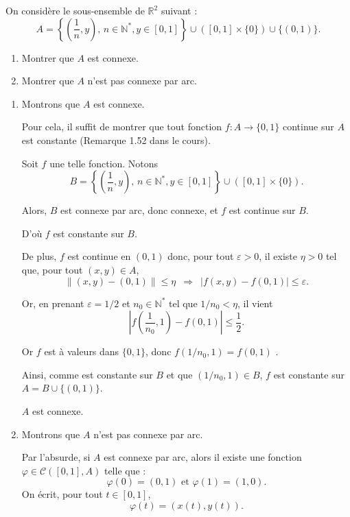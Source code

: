 \begin{question}{}{}
On considère le sous-ensemble de $\mathbb{R}^2$ suivant :
$$A = \left\{\left(\frac{1}{n},y\right),\, n\in\mathbb{N}^*,y\in[0,1]\right\} \cup \left([0,1]\times\{0\} \right)\cup\{(0,1)\}.$$

\begin{enumerate}

    \item Montrer que $A$ est connexe.
    \item Montrer que $A$ n'est pas connexe par arc.

\end{enumerate}

\end{question}

\begin{myproof}{}{}
\begin{enumerate}

    \item Montrons que $A$ est connexe.

Pour cela, il suffit de montrer que tout fonction $f:A\to \{0,1\}$ continue sur $A$ est constante (Remarque 1.52 dans le cours).

Soit $f$ une telle fonction. Notons
$$B=  \left\{\left(\frac{1}{n},y\right),\, n\in\mathbb{N}^*,y\in[0,1]\right\} \cup \left([0,1]\times\{0\} \right).$$

Alors, $B$ est connexe par arc, donc connexe, et $f$ est continue sur $B$.

D'où $f$ est constante sur $B$.

De plus, $f$ est continue en $(0,1)$ donc, pour tout $\varepsilon>0$, il existe $\eta > 0$ tel que, pour tout $(x,y) \in A$,
$$\|(x,y)-(0,1)\|\leq \eta \,\,\, \Longrightarrow \,\,\, |f(x,y) - f(0,1)| \leq \varepsilon.$$

Or, en prenant $\varepsilon=1/2$ et $n_0\in\mathbb{N}^*$ tel que $1/n_0<\eta$, il vient 
$$\left|f\left(\frac{1}{n_0},1\right) - f(0,1)\right|  \leq \frac{1}{2}.$$

Or $f$ est à valeurs dans $\{0,1\}$, donc $f(1/n_0,1) = f(0,1)$ .

Ainsi, comme est constante sur $B$ et que $(1/n_0,1)\in B$, $f$ est constante sur $A=B\cup\{(0,1)\}$.

$A$ est connexe.

\item Montrons que $A$ n'est pas connexe par arc.

Par l'absurde, si $A$ est connexe par arc, alors il existe une fonction $\varphi \in \mathcal{C}([0,1],A)$ telle que :
$$\varphi(0)= (0,1) \,\,\text{et}\,\, \varphi(1) = (1,0).$$
On écrit, pour tout $t\in[0,1]$,
$$\varphi(t)= (x(t),y(t)).$$


\end{enumerate}
\end{myproof}
